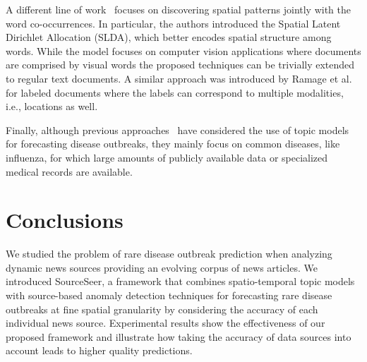 \documentclass[twoside,leqno,twocolumn]{article}
\newcommand{\fullmodel}{{{\sf SourceSeer}}\xspace}
\begin{document}
A different line of work~\cite{wang:2007} focuses on discovering spatial patterns jointly with the word co-occurrences. In particular, the authors introduced the Spatial Latent Dirichlet Allocation (SLDA), which better encodes spatial structure among words. While the model focuses on computer vision applications where documents are comprised by visual words the proposed techniques can be trivially extended to regular text documents. A similar approach was introduced by Ramage et al.~\cite{ramage:2009} for labeled documents where the labels can correspond to multiple modalities, i.e., locations as well.

Finally, although previous approaches~\cite{paul:11, sadilek:2012, rider:2013} have considered the use of topic models for forecasting disease outbreaks, they mainly focus on common diseases, like influenza, for which large amounts of publicly available data or specialized medical records are available. 
\vspace{-10pt}
\section{Conclusions}
\label{sec:conclusion}
We studied the problem of rare disease outbreak prediction when analyzing dynamic news sources providing an evolving corpus of news articles. We introduced \fullmodel, a framework that combines spatio-temporal topic models with source-based anomaly detection techniques for forecasting rare disease outbreaks at fine spatial granularity by considering the accuracy of each individual news source. Experimental results show the effectiveness of our proposed framework and illustrate how taking the accuracy of data sources into account leads to higher quality predictions.
\vspace{-10pt}
\end{document}
